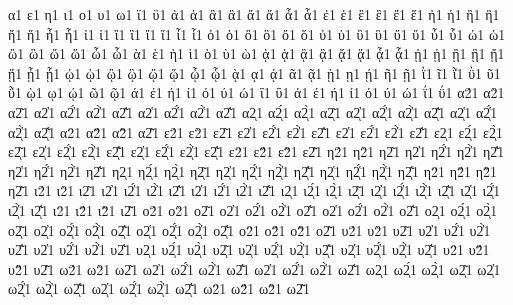 {α1 ε1 η1 ι1 ο1 υ1 ω1 ϊ1 ϋ1 ἀ1 ἁ1 ἂ1 ἃ1 ἄ1 ἅ1 ἆ1 ἇ1 ἐ1 ἑ1 ἒ1 ἓ1 ἔ1 ἕ1 ἠ1 ἡ1 ἢ1 ἣ1 ἤ1 ἥ1 ἦ1 ἧ1 ἰ1 ἱ1 ἲ1 ἳ1 ἴ1 ἵ1 ἶ1 ἷ1 ὀ1 ὁ1 ὂ1 ὃ1 ὄ1 ὅ1 ὐ1 ὑ1 ὒ1 ὓ1 ὔ1 ὕ1 ὖ1 ὗ1 ὠ1 ὡ1 ὢ1 ὣ1 ὤ1 ὥ1 ὦ1 ὧ1 ὰ1 ὲ1 ὴ1 ὶ1 ὸ1 ὺ1 ὼ1 ᾀ1 ᾁ1 ᾂ1 ᾃ1 ᾄ1 ᾅ1 ᾆ1 ᾇ1 ᾐ1 ᾑ1 ᾒ1 ᾓ1 ᾔ1 ᾕ1 ᾖ1 ᾗ1 ᾠ1 ᾡ1 ᾢ1 ᾣ1 ᾤ1 ᾥ1 ᾦ1 ᾧ1 ᾲ1 ᾳ1 ᾴ1 ᾶ1 ᾷ1 ῂ1 ῃ1 ῄ1 ῆ1 ῇ1 ῒ1 ῖ1 ῗ1 ῢ1 ῦ1 ῧ1 ῲ1 ῳ1 ῴ1 ῶ1 ῷ1 ά1 έ1 ή1 ί1 ό1 ύ1 ώ1 ΐ1 ΰ1 ά1 έ1 ή1 ί1 ό1 ύ1 ώ1 ΐ1 ΰ1 α2́1 α2̀1 α2͂1 α2̓1 α2̓́1 α2̓̀1 α2̓͂1 α2̔1 α2̔́1 α2̔̀1 α2̔͂1 α2ͅ1 α2́ͅ1 α2̀ͅ1 α2͂ͅ1 α2̓ͅ1 α2̓́ͅ1 α2̓̀ͅ1 α2̓͂ͅ1 α2̔ͅ1 α2̔́ͅ1 α2̔̀ͅ1 α2̔͂ͅ1 α2̈1 α2̈́1 α2̈̀1 α2̈͂1 ε2́1 ε2̀1 ε2͂1 ε2̓1 ε2̓́1 ε2̓̀1 ε2̓͂1 ε2̔1 ε2̔́1 ε2̔̀1 ε2̔͂1 ε2ͅ1 ε2́ͅ1 ε2̀ͅ1 ε2͂ͅ1 ε2̓ͅ1 ε2̓́ͅ1 ε2̓̀ͅ1 ε2̓͂ͅ1 ε2̔ͅ1 ε2̔́ͅ1 ε2̔̀ͅ1 ε2̔͂ͅ1 ε2̈1 ε2̈́1 ε2̈̀1 ε2̈͂1 η2́1 η2̀1 η2͂1 η2̓1 η2̓́1 η2̓̀1 η2̓͂1 η2̔1 η2̔́1 η2̔̀1 η2̔͂1 η2ͅ1 η2́ͅ1 η2̀ͅ1 η2͂ͅ1 η2̓ͅ1 η2̓́ͅ1 η2̓̀ͅ1 η2̓͂ͅ1 η2̔ͅ1 η2̔́ͅ1 η2̔̀ͅ1 η2̔͂ͅ1 η2̈1 η2̈́1 η2̈̀1 η2̈͂1 ι2́1 ι2̀1 ι2͂1 ι2̓1 ι2̓́1 ι2̓̀1 ι2̓͂1 ι2̔1 ι2̔́1 ι2̔̀1 ι2̔͂1 ι2ͅ1 ι2́ͅ1 ι2̀ͅ1 ι2͂ͅ1 ι2̓ͅ1 ι2̓́ͅ1 ι2̓̀ͅ1 ι2̓͂ͅ1 ι2̔ͅ1 ι2̔́ͅ1 ι2̔̀ͅ1 ι2̔͂ͅ1 ι2̈1 ι2̈́1 ι2̈̀1 ι2̈͂1 ο2́1 ο2̀1 ο2͂1 ο2̓1 ο2̓́1 ο2̓̀1 ο2̓͂1 ο2̔1 ο2̔́1 ο2̔̀1 ο2̔͂1 ο2ͅ1 ο2́ͅ1 ο2̀ͅ1 ο2͂ͅ1 ο2̓ͅ1 ο2̓́ͅ1 ο2̓̀ͅ1 ο2̓͂ͅ1 ο2̔ͅ1 ο2̔́ͅ1 ο2̔̀ͅ1 ο2̔͂ͅ1 ο2̈1 ο2̈́1 ο2̈̀1 ο2̈͂1 υ2́1 υ2̀1 υ2͂1 υ2̓1 υ2̓́1 υ2̓̀1 υ2̓͂1 υ2̔1 υ2̔́1 υ2̔̀1 υ2̔͂1 υ2ͅ1 υ2́ͅ1 υ2̀ͅ1 υ2͂ͅ1 υ2̓ͅ1 υ2̓́ͅ1 υ2̓̀ͅ1 υ2̓͂ͅ1 υ2̔ͅ1 υ2̔́ͅ1 υ2̔̀ͅ1 υ2̔͂ͅ1 υ2̈1 υ2̈́1 υ2̈̀1 υ2̈͂1 ω2́1 ω2̀1 ω2͂1 ω2̓1 ω2̓́1 ω2̓̀1 ω2̓͂1 ω2̔1 ω2̔́1 ω2̔̀1 ω2̔͂1 ω2ͅ1 ω2́ͅ1 ω2̀ͅ1 ω2͂ͅ1 ω2̓ͅ1 ω2̓́ͅ1 ω2̓̀ͅ1 ω2̓͂ͅ1 ω2̔ͅ1 ω2̔́ͅ1 ω2̔̀ͅ1 ω2̔͂ͅ1 ω2̈1 ω2̈́1 ω2̈̀1 ω2̈͂1 
}
\endgroup
\endinput
